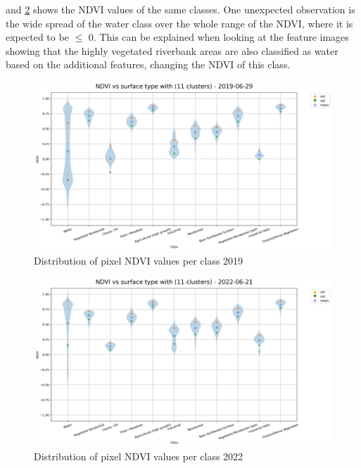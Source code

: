 \documentclass[12pt,a4paper, english,twoside]{scrartcl}
\begin{document}
        and \cref{fig:ndviclusters2022} shows the NDVI values of the same classes.
       One unexpected observation is the wide spread of the water class over the whole range of the NDVI, where it is expected to be $\le$ 0. 
       This can be explained when looking at the feature images showing that the highly vegetated riverbank areas are also classified as water based on the additional features, changing the NDVI of this class.
       \begin{landscape}
         \begin{figure}[!p]
           \centering
           \includegraphics[width=0.91\linewidth]{img/NDVI vs surface type with (11 clusters) - 2019-06-29.png}
           \caption{Distribution of pixel \gls{NDVI} values per class 2019\label{fig:ndviclusters2019}}
         \end{figure}

         \begin{figure}[!p]
           \centering
           \includegraphics[width=0.91\linewidth]{img/NDVI vs surface type with (11 clusters) - 2022-06-21.png}
           \caption{Distribution of pixel \gls{NDVI} values per class 2022\label{fig:ndviclusters2022}}
         \end{figure}
       \end{landscape}
\end{document}
